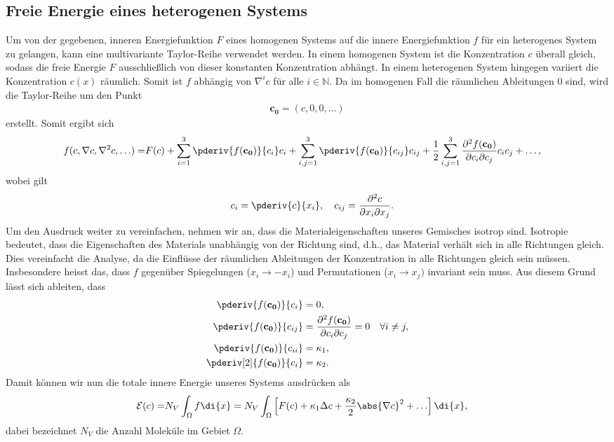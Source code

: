 \subsection{Freie Energie eines heterogenen Systems}
Um von der gegebenen, inneren Energiefunktion $F$ eines homogenen Systems
auf die innere Energiefunktion $f$ für ein heterogenes System zu gelangen,
kann eine multivariante Taylor-Reihe verwendet werden.
In einem homogenen System ist die Konzentration $c$ überall gleich,
sodass die freie Energie $F$ ausschließlich von dieser konstanten Konzentration abhängt.
In einem heterogenen System hingegen variiert die Konzentration $c(x)$ räumlich.
Somit ist $f$ abhängig von $\nabla^i c$ für alle $i \in \mathbb{N}$.
Da im homogenen Fall die räumlichen Ableitungen $0$ sind,
wird die Taylor-Reihe um den Punkt
\begin{align*}
\mathbf{c_0}
=
(c, 0, 0, \ldots)
\end{align*}
erstellt.
Somit ergibt sich
\begin{align*}
f(c, \nabla c, \nabla^2 c, \ldots)
=
& F(c)
+ \sum_{i=1}^3 \pderiv{f(\mathbf{c_0})}{c_i} c_i
+ \sum_{i,j=1}^3 \pderiv{f(\mathbf{c_0})}{c_{ij}} c_{ij}
+ \frac{1}{2} \sum_{i,j=1}^3 \frac{\partial^2 f(\mathbf{c_0})}{%
\partial c_i \partial c_j} c_{i} c_{j}
+ \ldots
,
\end{align*}
wobei gilt
\begin{align*}
\quad
c_i
=
\pderiv{c}{x_i}
,\quad
c_{ij}
=
\frac{\partial^2 c}{\partial x_i \partial x_j}
.
\end{align*}
Um den Ausdruck weiter zu vereinfachen,
nehmen wir an,
dass die Materialeigenschaften unseres Gemisches isotrop sind.
Isotropie bedeutet,
dass die Eigenschaften des Materials unabhängig von der Richtung sind,
d.h.,
das Material verhält sich in alle Richtungen gleich.
Dies vereinfacht die Analyse,
da die Einflüsse der räumlichen Ableitungen der Konzentration
in alle Richtungen gleich sein müssen.
Insbesondere heisst das,
dass $f$ gegenüber Spiegelungen ($x_i \rightarrow -x_i$) und
Permutationen ($x_i \rightarrow x_j)$ invariant sein muss.
Aus diesem Grund lässt sich ableiten,
dass
\begin{align*}
\pderiv{f(\mathbf{c_0})}{c_i}
&=
0,
\\
\pderiv{f(\mathbf{c_0})}{c_{ij}}
&=
\frac{\partial^2 f(\mathbf{c_0})}{\partial c_i \partial c_j}
=
0
\quad \forall i \neq j,
\\
\pderiv{f(\mathbf{c_0})}{c_{ii}}
&=
\kappa_1,
\\
 \pderiv[2]{f(\mathbf{c_0})}{c_i}
&=
\kappa_2
.
\end{align*}
Damit können wir nun die totale innere Energie unseres Systems ausdrücken als
\begin{align}
\mathcal{E}(c)
=
&N_V \int_\Omega f\di{x}
=
N_V \int_\Omega \left[
F(c) + \kappa_1 \Delta c + \frac{\kappa_2}{2} \abs{\nabla c}^2  + \ldots
\right]\di{x}
\label{cahnhilliard:energylong}
,
\end{align}
dabei bezeichnet $N_V$ die Anzahl Moleküle im Gebiet $\Omega$.

